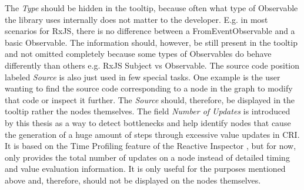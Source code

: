 The \emph{Type} should be hidden in the tooltip, because often what type of Observable the library uses internally does not matter to the developer. E.g. in most scenarios for RxJS, there is no difference between a FromEventObservable and a basic Observable. The information should, however, be still present in the tooltip and not omitted completely because some types of Observables do behave differently than others e.g. RxJS Subject vs Observable. The source code position labeled \emph{Source} is also just used in few special tasks. One example is the user wanting to find the source code corresponding to a node in the graph to modify that code or inspect it further. The \emph{Source} should, therefore, be displayed in the tooltip rather the nodes themselves. The field \emph{Number of Updates} is introduced by this thesis as a way to detect bottlenecks and help identify nodes that cause the generation of a huge amount of steps through excessive value updates in CRI. It is based on the Time Profiling feature of the Reactive Inspector \cite{ReactiveInspector}, but for now, only provides the total number of updates on a node instead of detailed timing and value evaluation information. It is only useful for the purposes mentioned above and, therefore, should not be displayed on the nodes themselves.

